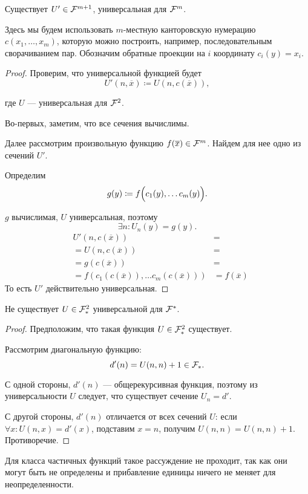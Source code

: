 \begin{cor}
    Существует $ U' \in  \mathcal{F}^{m+1}$, универсальная для $ \mathcal{F}^{m}$.
\end{cor}
\begin{note}
    Здесь мы будем использовать $ m$-местную канторовскую нумерацию $ c(x_1, \ldots , x_m)$, которую можно построить, например, последовательным сворачиванием пар.
	Обозначим обратные проекции на $ i$ координату $ c_i(y) = x_i$.
\end{note}
\begin{proof}
	Проверим, что универсальной функцией будет
	\[
		U'(n, \overline{x}) \coloneqq U(n, c(\overline{x}))
	,\] 

	где $ U$ --- универсальная для $ \mathcal{F}^{2}$.

	Во-первых, заметим, что все сечения вычислимы. 

	Далее рассмотрим произвольную функцию $ f(\overline{x}) \in \mathcal{F}^{m}$. Найдем для нее одно из сечений $ U'$.

	Определим 
	\[
		g(y)\coloneqq f\Bigl(c_1(y), \ldots c_m(y)\Bigr)
	.\] 

	$ g$ вычислимая, $ U$ универсальная, поэтому 
	\[
		\exists n \colon  U_n(y) = g(y)
	.\] 
	\begin{align*}
		& U'(n, c(\overline{x})) &=  \tag{по определению  $U$} \\
		&=U(n, c(\overline{x})) &= \tag{$ n$ -- номер $g$} \\
		&=g(c(\overline{x})) &= \tag{по определению $g$} \\
		&= f(c_1(c(\overline{x})), \ldots c_{m}(c(\overline{x})))&= f(\overline{x})
	\end{align*}
	То есть $ U'$ действительно универсальная.
\end{proof}


\begin{thm}
    Не существует $ U \in \mathcal{F}_{*}^{2}$ универсальной для $ \mathcal{F}^{*}$.
\end{thm}
\begin{proof}
    Предположим, что такая функция $ U \in  \mathcal{F}_{*}^{2}$ существует.

	Рассмотрим диагональную функцию:
	\[
		d'(n) = U(n, n) + 1 \in \mathcal{F}_{*}
	.\] 

	С одной стороны, $ d'(n) $  --- общерекурсивная функция, поэтому из универсальности $ U$ следует, что существует сечение $ U_n = d'$.

	С другой стороны, $d'(n)$ отличается от всех сечений $ U$: 
	если $ \forall x \colon U(n, x) = d'(x)$, подставим $ x = n $, получим $U(n, n) = U(n, n ) + 1$. Противоречие. 
\end{proof}
\begin{note}
    Для класса частичных функций такое рассуждение не проходит, так как они могут быть не определены и прибавление единицы ничего не меняет для неопределенности.
\end{note}

